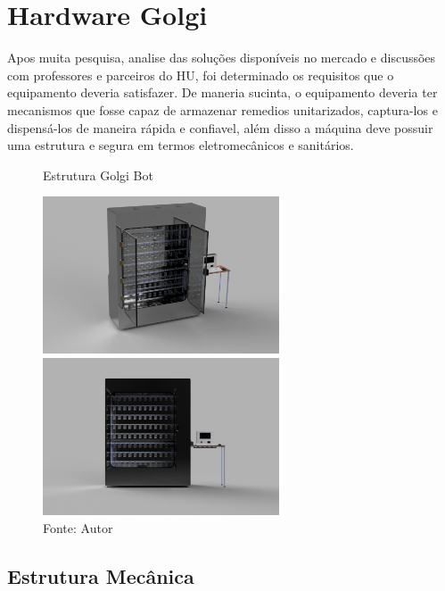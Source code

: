 \documentclass[../poliXuniversity_hospital_(USP)_report.tex]{subfiles}
\begin{document}
\chapter{Hardware Golgi}

Apos muita pesquisa, analise das soluções disponíveis no mercado e discussões com professores e parceiros do HU, foi determinado os requisitos que o equipamento deveria satisfazer. De maneria sucinta, o equipamento deveria ter mecanismos que fosse capaz de armazenar remedios unitarizados, captura-los e dispensá-los de maneira rápida e confiavel, além disso a máquina deve possuir uma estrutura e segura em termos eletromecânicos e sanitários. 

\begin{figure}[h]
\centering
\caption{Estrutura Golgi Bot}
    \begin{minipage}{0.5\textwidth}
       \centering
        
        \centering %
        \includegraphics[width=7cm]{images/estrutura_golgi.png}
        
        
    \end{minipage}\hfill
    \begin{minipage}{0.5\textwidth}
        \centering
        \centering %
        \includegraphics[width=7cm]{images/estrutura_golgi_1.png}
    \end{minipage}\hfill
    \caption*{Fonte: Autor}
    \label{figura: Estrutura Golgi Bot}
\end{figure}

\section{Estrutura Mecânica}
\end{document}
